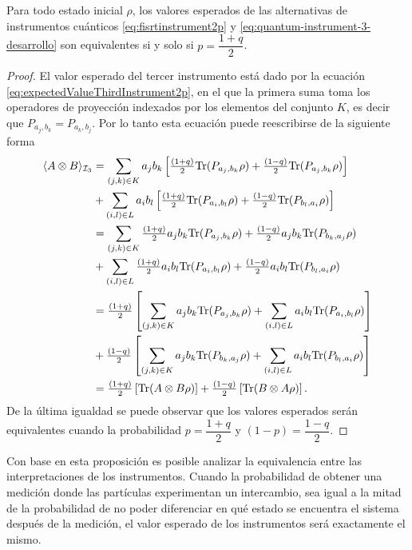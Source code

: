 \begin{proposition}\label{prop:Equivalencia-instruments-1-3}
    Para todo estado inicial $\rho$, los valores esperados de las alternativas
de instrumentos cuánticos {\eqref{eq:fisrtinstrument2p}} y
{\eqref{eq:quantum-instrument-3-desarrollo}} son equivalentes si y solo si
$p=\dfrac{1+q}{2}$.
\end{proposition}


\begin{proof}
El valor esperado del tercer instrumento está dado por la ecuación {\eqref{eq:expectedValueThirdInstrument2p}}, en el que la primera suma toma los operadores de proyección indexados por los elementos del conjunto $K$, es decir que $P_{a_j,b_k}=P_{a_k,b_j}$. Por lo tanto esta ecuación puede reescribirse de la siguiente forma \begin{equation*}
    \begin{split}
        \langle A\otimes B \rangle_{\mathcal{I}_3}&=\sum_{(j,k)\in K} a_j b_k \left[\tfrac{(1+q)}{2} {\rm Tr}(P_{a_j, b_k}\rho)+ \tfrac{(1-q)}{2} {\rm Tr}(P_{a_j, b_k}\rho)\right]\\
        &+\sum_{(i,l)\in L}a_i b_l \left[\tfrac{(1+q)}{2}{\rm Tr}(P_{a_i,b_l}\rho) +\tfrac{(1-q)}{2} {\rm Tr}(P_{b_l, a_i}\rho)\right]\\
        &=\sum_{(j,k)\in K} \tfrac{(1+q)}{2} a_j b_k{\rm Tr}(P_{a_j, b_k}\rho) + \tfrac{(1-q)}{2} a_j b_k {\rm Tr}(P_{ b_k,a_j}\rho)\\
        &+\sum_{(i,l)\in L}\tfrac{(1+q)}{2}a_i b_l {\rm Tr}(P_{a_i,b_l}\rho) +\tfrac{(1-q)}{2}a_i b_l {\rm Tr}(P_{b_l, a_i}\rho)\\
        &=\tfrac{(1+q)}{2}\left[\sum_{(j,k)\in K}  a_j b_k {\rm Tr}(P_{a_j, b_k}\rho)+\sum_{(i,l)\in L}a_i b_l {\rm Tr}(P_{a_i,b_l}\rho)  \right] \\
        &+\tfrac{(1-q)}{2}\left[\sum_{(j,k)\in K}a_j b_k {\rm Tr}(P_{ b_k,a_j}\rho)+\sum_{(i,l) \in L}a_i b_l {\rm Tr}(P_{b_l, a_i}\rho)\right]\\
        &=\tfrac{(1+q)}{2}\left[{\rm Tr}(A\otimes B \rho)  \right] +\tfrac{(1-q)}{2}\left[{\rm Tr}(B\otimes A \rho)\right].\\
    \end{split}
\end{equation*}De la última igualdad se puede observar que los valores esperados serán equivalentes cuando la probabilidad $p=\dfrac{1+q}{2}$ y $(1-p)=\dfrac{1-q}{2}$.
\end{proof}

Con base en esta proposición es posible analizar la equivalencia entre las interpretaciones de los instrumentos. Cuando la probabilidad %
de obtener una medición donde las partículas experimentan un intercambio, sea igual a la mitad de la probabilidad %
 de no poder diferenciar en qué estado se encuentra el sistema después de la medición, el valor esperado de los instrumentos  será exactamente el mismo.   






